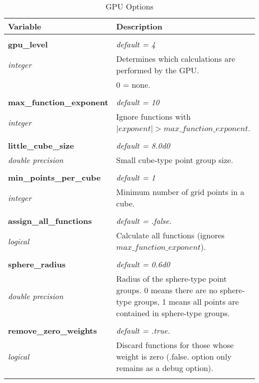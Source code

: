 \begin{Spacing}{1.0}
\begin{longtable}{ p{} p{} }

   \toprule
   \textbf{Variable} & Description \\*
   \midrule \\*
   \endhead

   \bottomrule
   \caption{GPU Options}
   \endfoot

   \textbf{gpu\_level}
   &  \textit{default = 4}
   \\*\textit{integer}
   & Determines which calculations are performed by
   the GPU.\\*
   &     0 = none.\\* \\

   \textbf{max\_function\_exponent}
   &  \textit{default = 10}
   \\*\textit{integer}
   & Ignore functions with $\lvert exponent \rvert > 
   max\_function\_exponent$.\\* \\

   \textbf{little\_cube\_size}
   &  \textit{default = 8.0d0}
   \\*\textit{double precision}
   & Small cube-type point group size.\\* \\

   \textbf{min\_points\_per\_cube}
   &  \textit{default = 1}
   \\*\textit{integer}
   & Minimum number of grid points in a cube.\\* \\

   \textbf{assign\_all\_functions}
   &  \textit{default = .false. }
   \\*\textit{logical}
   & Calculate all functions (ignores
   $max\_function\_exponent$).\\* \\

   \textbf{sphere\_radius}
   &  \textit{default = 0.6d0}
   \\*\textit{double precision}
   & Radius of the sphere-type point groups. 0 means
   there are no sphere-type groups, 1 means all points
   are contained in sphere-type groups.\\* \\

   \textbf{remove\_zero\_weights}
   &  \textit{default = .true. }
   \\*\textit{logical}
   & Discard functions for those whose weight is zero
   (.false. option only remains as a debug option).
   \\* \\


\end{longtable}
\end{Spacing}
